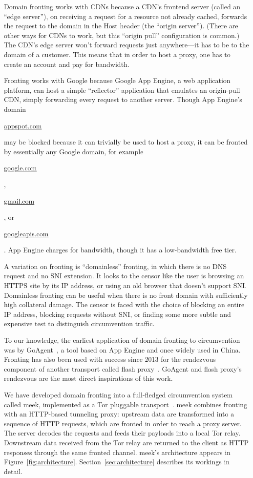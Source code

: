 \documentclass[conference]{IEEEtran}
\def\urll#1{\begin{NoHyper}\url{#1}\end{NoHyper}}
\begin{document}
Domain fronting works with CDNs because a CDN's frontend server
(called an ``edge server''),
on receiving a request for a resource not already cached,
forwards the request to the domain in the Host header
(the ``origin server'').
(There are other ways for CDNs to work, but this ``origin pull''
configuration is common.)
The CDN's edge server won't forward requests just anywhere---it
has to be to the domain of a customer.
This means that in order to host a proxy,
one has to create an account and pay for bandwidth.

Fronting works with Google because Google App Engine, a web application platform,
can host a simple ``reflector'' application that emulates
an origin-pull CDN, simply forwarding every request to another server.
Though App Engine's domain \urll{appspot.com}
may be blocked because it can trivially be used to host a proxy,
it can be fronted by essentially any Google domain, for example
\urll{google.com}, \urll{gmail.com}, or \urll{googleapis.com}.
App Engine charges for bandwidth,
though it has a low-bandwidth free tier.

A variation on fronting is ``domainless'' fronting,
in which there is no DNS request and no SNI extension.
It looks to the censor
like the user is browsing an HTTPS site by its IP address,
or using an old browser that doesn't support SNI.
Domainless fronting can be useful when there is no front domain
with sufficiently high collateral damage.
The censor is faced with the choice of blocking an entire IP address,
blocking requests without SNI,
or finding some more subtle and expensive test to distinguish
circumvention traffic.

To our knowledge,
the earliest application of domain fronting to circumvention
was by GoAgent~\cite{goagent},
a tool based on App Engine and
once widely used in China.
Fronting has also been used with success since 2013
for the rendezvous component of another transport called flash proxy~\cite{flashproxy}.
GoAgent and flash proxy's rendezvous are the most direct
inspirations of this work.

We have developed domain fronting into a full-fledged circumvention system called meek,
implemented as a Tor pluggable transport~\cite{pt}.
meek combines fronting with an HTTP-based tunneling proxy:
upstream data are transformed into a sequence of HTTP requests,
which are fronted in order to reach a proxy server.
The server decodes the requests and feeds their payloads
into a local Tor relay.
Downstream data received from the Tor relay
are returned to the client as HTTP responses
through the same fronted channel.
meek's architecture appears in Figure~\ref{fig:architecture}.
Section~\ref{sec:architecture} describes its workings in detail.
\end{document}
